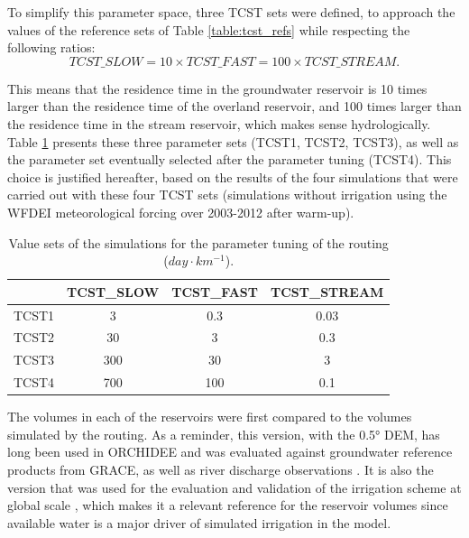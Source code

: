 To simplify this parameter space, three TCST sets were defined, to approach the values of the reference sets of Table \ref{table:tcst_refs} while respecting the following ratios:
\begin{equation}
    TCST\_SLOW = 10 \times TCST\_FAST = 100 \times TCST\_STREAM.
\end{equation}

This means that the residence time in the groundwater reservoir is 10 times larger than the residence time of the overland reservoir, and 100 times larger than the residence time in the stream reservoir, which makes sense hydrologically.
Table \ref{table:tcst_exp} presents these three parameter sets (TCST1, TCST2, TCST3), as well as the parameter set eventually selected after the parameter tuning (TCST4). This choice is justified hereafter, based on the results of the four simulations that were carried out with these four TCST sets (simulations without irrigation using the WFDEI meteorological forcing over 2003-2012 after warm-up). 

\begin{table}[h]
\centering
\begin{tabular}{|l|c|c|c|}
\hline
\textbf{} & \textbf{TCST\_SLOW} & \textbf{TCST\_FAST} & \textbf{TCST\_STREAM} \\ \hline
TCST1 & 3 & 0.3 & 0.03 \\ \hline
TCST2 & 30 & 3 & 0.3 \\ \hline
TCST3 & 300 & 30 & 3 \\ \hline
TCST4 & 700 & 100 & 0.1 \\ \hline
\end{tabular}
\caption{Value sets of the simulations for the parameter tuning of the \native routing ($day \cdot km^{-1}$).}
\label{table:tcst_exp}
\end{table}


The volumes in each of the reservoirs were first compared to the volumes simulated by the \std routing. As a reminder, this version, with the 0.5° DEM, has long been used in ORCHIDEE and was evaluated against groundwater reference products from GRACE, as well as river discharge observations  \citep{ngo-duc_53-year_2005, ngo-duc_validation_2007}.
It is also the version that was used for the evaluation and validation of the irrigation scheme at global scale \citep{arboleda-obando_validation_2024}, which makes it a relevant reference for the reservoir volumes since available water is a major driver of simulated irrigation in the model. 

